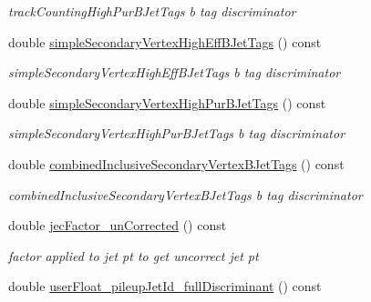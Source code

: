 \begin{DoxyCompactItemize}
\begin{DoxyCompactList}\small\item\em track\-Counting\-High\-Pur\-B\-Jet\-Tags b tag discriminator \end{DoxyCompactList}\item 
\hypertarget{classran_1_1NtJet_a802d3c0f4d9bed5c98c7cceff8632599}{double \hyperlink{classran_1_1NtJet_a802d3c0f4d9bed5c98c7cceff8632599}{simple\-Secondary\-Vertex\-High\-Eff\-B\-Jet\-Tags} () const }\label{classran_1_1NtJet_a802d3c0f4d9bed5c98c7cceff8632599}

\begin{DoxyCompactList}\small\item\em simple\-Secondary\-Vertex\-High\-Eff\-B\-Jet\-Tags b tag discriminator \end{DoxyCompactList}\item 
\hypertarget{classran_1_1NtJet_a64b9c27a1a33fd9345b8711c62ef04dd}{double \hyperlink{classran_1_1NtJet_a64b9c27a1a33fd9345b8711c62ef04dd}{simple\-Secondary\-Vertex\-High\-Pur\-B\-Jet\-Tags} () const }\label{classran_1_1NtJet_a64b9c27a1a33fd9345b8711c62ef04dd}

\begin{DoxyCompactList}\small\item\em simple\-Secondary\-Vertex\-High\-Pur\-B\-Jet\-Tags b tag discriminator \end{DoxyCompactList}\item 
\hypertarget{classran_1_1NtJet_ad308766f159b857b5347cc8e0274ab56}{double \hyperlink{classran_1_1NtJet_ad308766f159b857b5347cc8e0274ab56}{combined\-Inclusive\-Secondary\-Vertex\-B\-Jet\-Tags} () const }\label{classran_1_1NtJet_ad308766f159b857b5347cc8e0274ab56}

\begin{DoxyCompactList}\small\item\em combined\-Inclusive\-Secondary\-Vertex\-B\-Jet\-Tags b tag discriminator \end{DoxyCompactList}\item 
\hypertarget{classran_1_1NtJet_a896d1123cdaa0ef4ba22246c97ba0972}{double \hyperlink{classran_1_1NtJet_a896d1123cdaa0ef4ba22246c97ba0972}{jec\-Factor\-\_\-un\-Corrected} () const }\label{classran_1_1NtJet_a896d1123cdaa0ef4ba22246c97ba0972}

\begin{DoxyCompactList}\small\item\em factor applied to jet pt to get uncorrect jet pt \end{DoxyCompactList}\item 
\hypertarget{classran_1_1NtJet_a23d9226dd24b48ba16afc96c59a7bbdd}{double \hyperlink{classran_1_1NtJet_a23d9226dd24b48ba16afc96c59a7bbdd}{user\-Float\-\_\-pileup\-Jet\-Id\-\_\-full\-Discriminant} () const }\label{classran_1_1NtJet_a23d9226dd24b48ba16afc96c59a7bbdd}


\end{DoxyCompactItemize}
